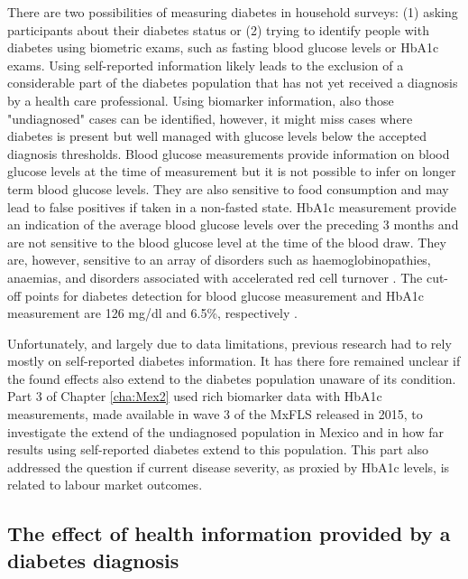 There are two possibilities of measuring diabetes in household surveys: (1) asking participants about their diabetes status or (2) trying to identify people with diabetes using biometric exams, such as fasting blood glucose levels or \ac{HbA1c} exams. Using self-reported information likely leads to the exclusion of a considerable part of the diabetes population that has not yet received a diagnosis by a health care professional. Using biomarker information, also those "undiagnosed" cases can be identified, however, it might miss cases where diabetes is present but well managed with glucose levels below the accepted diagnosis thresholds. Blood glucose measurements provide information on blood glucose levels at the time of measurement but it is not possible to infer on longer term blood glucose levels. They are also sensitive to food consumption and may lead to false positives if taken in a non-fasted state. \ac{HbA1c} measurement provide an indication of the average blood glucose levels over the preceding 3 months and are not sensitive to the blood glucose level at the time of the blood draw. They are, however, sensitive to an array of disorders such as haemoglobinopathies, anaemias, and disorders associated with accelerated red cell turnover \parencite{WorldHealthOrganization2011}. The cut-off points for diabetes detection for blood glucose measurement and \ac{HbA1c} measurement are 126 mg/dl and 6.5\%, respectively \parencite{WorldHealthOrganization2006,WorldHealthOrganization2011}.

Unfortunately, and largely due to data limitations, previous research had to rely mostly on self-reported diabetes information. It has there fore remained unclear if the found effects also extend to the diabetes population unaware of its condition. Part 3 of Chapter \ref{cha:Mex2} used rich biomarker data with \ac{HbA1c} measurements, made available in wave 3 of the \ac{MxFLS} released in 2015, to investigate the extend of the undiagnosed population in Mexico and in how far results using self-reported diabetes extend to this population. This part also addressed the question if current disease severity, as proxied by \ac{HbA1c} levels, is related to labour market outcomes.

\subsection{The effect of health information provided by a diabetes diagnosis}

